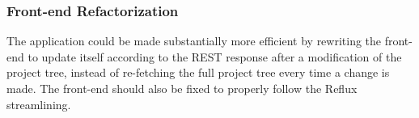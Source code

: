 \documentclass[a4paper,12pt]{article}
\begin{document}
\subsubsection{Front-end Refactorization}
The application could be made substantially more efficient by rewriting the front-end to update
itself according to the REST response after a modification of the project tree, instead of 
re-fetching the full project tree every time a change is made. The front-end should also be fixed to
properly follow the Reflux streamlining.

\newpage


\end{document}
